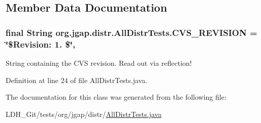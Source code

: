 \subsection{Member Data Documentation}
\hypertarget{classorg_1_1jgap_1_1distr_1_1_all_distr_tests_a6d3745acb67e8ae9882207c983d556dd}{
\subsubsection[{C\-V\-S\-\_\-\-R\-E\-V\-I\-S\-I\-O\-N}]{\setlength{\rightskip}{0pt plus 5cm}final String org.\-jgap.\-distr.\-All\-Distr\-Tests.\-C\-V\-S\-\_\-\-R\-E\-V\-I\-S\-I\-O\-N = \char`\"{}\$Revision\-: 1. \$\char`\"{}\hspace{0.3cm}{\ttfamily [static]}, {\ttfamily [private]}}}\label{classorg_1_1jgap_1_1distr_1_1_all_distr_tests_a6d3745acb67e8ae9882207c983d556dd}
String containing the C\-V\-S revision. Read out via reflection! 

Definition at line 24 of file All\-Distr\-Tests.\-java.



The documentation for this class was generated from the following file\-:\begin{DoxyCompactItemize}
\item 
L\-D\-H\-\_\-\-Git/tests/org/jgap/distr/\hyperlink{_all_distr_tests_8java}{All\-Distr\-Tests.\-java}\end{DoxyCompactItemize}
